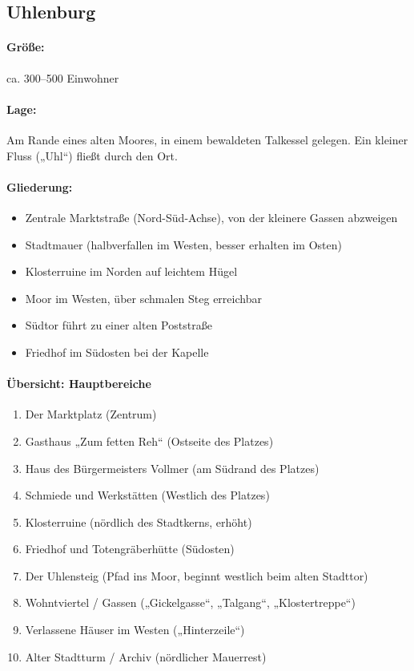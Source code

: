 \subsection{Uhlenburg}
\paragraph{Größe:} ca. 300–500 Einwohner
\paragraph{Lage:} Am Rande eines alten Moores, in einem bewaldeten Talkessel gelegen. Ein kleiner Fluss („Uhl“) fließt durch den Ort.
\paragraph{Gliederung:}
\begin{itemize}
\item Zentrale Marktstraße (Nord-Süd-Achse), von der kleinere Gassen abzweigen
\item Stadtmauer (halbverfallen im Westen, besser erhalten im Osten)
\item Klosterruine im Norden auf leichtem Hügel
\item Moor im Westen, über schmalen Steg erreichbar
\item Südtor führt zu einer alten Poststraße
\item Friedhof im Südosten bei der Kapelle
\end{itemize}

\paragraph{Übersicht: Hauptbereiche}
\begin{enumerate}
\item Der Marktplatz (Zentrum)
\item Gasthaus „Zum fetten Reh“ (Ostseite des Platzes)
\item Haus des Bürgermeisters Vollmer (am Südrand des Platzes)
\item Schmiede und Werkstätten (Westlich des Platzes)
\item Klosterruine (nördlich des Stadtkerns, erhöht)
\item Friedhof und Totengräberhütte (Südosten)
\item Der Uhlensteig (Pfad ins Moor, beginnt westlich beim alten Stadttor)
\item Wohntviertel / Gassen („Gickelgasse“, „Talgang“, „Klostertreppe“)
\item Verlassene Häuser im Westen („Hinterzeile“)
\item Alter Stadtturm / Archiv (nördlicher Mauerrest)
\end{enumerate}

